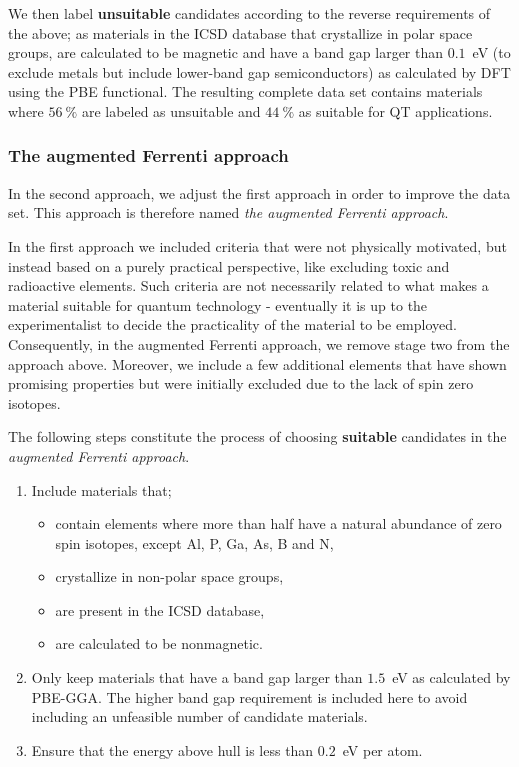 \documentclass[superscriptaddress,unsortedaddress,
 amsmath,amssymb,
 aps,
]{revtex4-2}
\begin{document}
We then label \textbf{unsuitable} candidates according to the reverse requirements of the above; as materials in the ICSD database that crystallize in polar space groups, are calculated 
to be magnetic and have a band gap larger than $0.1$~eV (to exclude metals but include lower-band gap semiconductors) as calculated by DFT using the PBE functional.
The resulting complete data set contains materials where $56 \ \%$ are labeled as unsuitable and $44 \ \%$ as suitable for QT applications. 

\subsubsection*{The augmented Ferrenti approach}
In the second approach, we adjust the first approach in order to improve the data set. This approach is therefore named \emph{the augmented Ferrenti approach}.

In the first approach we included criteria that were not physically motivated, but instead based on a purely practical perspective, like excluding toxic and radioactive elements. Such criteria are not necessarily related to what makes a material suitable for quantum technology - eventually it is up to the experimentalist to decide the practicality of the material to be employed. 
Consequently, in the augmented Ferrenti approach, we remove stage two from the approach above. Moreover, we include a few additional elements that have shown promising properties but were initially excluded due to the lack of spin zero isotopes. 

The following steps constitute the process of choosing \textbf{suitable} candidates 
in the \emph{augmented Ferrenti approach}. 
\begin{enumerate}
    \item Include materials that; 
    \begin{itemize}
        \item contain elements where more than half have a natural abundance of zero spin isotopes, except Al, P, Ga, As, B and N, 
        \item crystallize in non-polar space groups,
        \item are present in the ICSD database,
        \item are calculated to be nonmagnetic. 
    \end{itemize}
    \item Only keep materials that have a band gap larger than $1.5$~eV as calculated by PBE-GGA. The higher band gap requirement is included here to avoid including an unfeasible number of candidate materials. 
    \item Ensure that the energy above hull is less than $0.2$~eV per atom. 
\end{enumerate}
\end{document}
